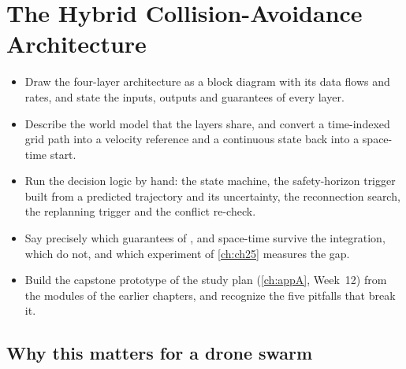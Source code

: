 \chapter[The Hybrid Architecture]{The Hybrid Collision-Avoidance Architecture}
\label{ch:ch24}

\begin{objectives}
\begin{itemize}
  \item Draw the four-layer architecture as a block diagram with its data flows and rates, and state the inputs, outputs and guarantees of every layer.
  \item Describe the world model that the layers share, and convert a time-indexed grid path into a velocity reference and a continuous state back into a space-time start.
  \item Run the decision logic by hand: the state machine, the safety-horizon trigger built from a predicted trajectory and its uncertainty, the reconnection search, the replanning trigger and the conflict re-check.
  \item Say precisely which guarantees of \cbs, \orca and space-time \astar survive the integration, which do not, and which experiment of \cref{ch:ch25} measures the gap.
  \item Build the capstone prototype of the study plan (\cref{ch:appA}, Week~12) from the modules of the earlier chapters, and recognize the five pitfalls that break it.
\end{itemize}
\end{objectives}

\section{Why this matters for a drone swarm}
\label{sec:ch24-motivation}

